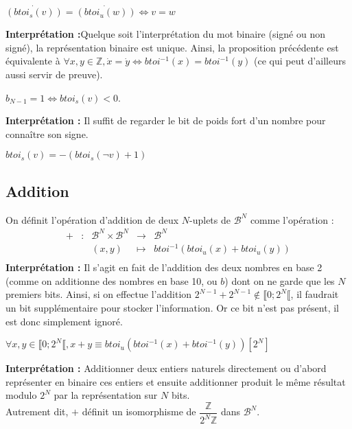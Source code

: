 \documentclass[../../main.tex]{subfiles}
\begin{document}
\proposition{} $\dot{(btoi_{s}(v))} = \dot{(btoi_{u}(w))} \Leftrightarrow v = w$

\textbf{Interprétation :}\newline Quelque soit l'interprétation du mot binaire (signé ou non signé), la représentation binaire est unique. Ainsi, la proposition précédente est équivalente à $\forall{x, y\in{\mathbb{Z}}}, \dot{x} = \dot{y} \Leftrightarrow btoi^{-1}(x) = btoi^{-1}(y)$ (ce qui peut d'ailleurs aussi servir de preuve).

\proposition{} $b_{N-1} = 1 \Leftrightarrow btoi_{s}(v) < 0$.

\textbf{Interprétation :} Il suffit de regarder le bit de poids fort d'un nombre pour connaître son signe.

\proposition{} $btoi_{s}(v) = -(btoi_{s}(\neg{v}) + 1)$

\subsection{Addition} \label{sub:addition}
On définit l'opération d'addition de deux $N$-uplets de $\mathcal{B}^{N}$ comme l'opération :
$$
\begin{array}{lclcl}
+ & : & \mathcal{B}^{N}\times{\mathcal{B}^{N}} & \rightarrow & \mathcal{B}^{N} \\
  &   & (x, y) & \mapsto & btoi^{-1}(btoi_{u}(x) + btoi_{u}(y)) \\
\end{array}
$$
\textbf{Interprétation :} Il s'agit en fait de l'addition des deux nombres en base 2 (comme on additionne des nombres en base 10, ou $b$) dont on ne garde que les $N$ premiers bits. Ainsi, si on effectue l'addition $2^{N-1} + 2^{N-1}\notin{\llbracket 0; 2^{N}\llbracket}$, il faudrait un bit supplémentaire pour stocker l'information. Or ce bit n'est pas présent, il est donc simplement ignoré.

 $\forall{x, y\in{\llbracket 0; 2^{N}\llbracket}}, x + y \equiv btoi_{u}(btoi^{-1}(x) + btoi^{-1}(y)) [2^{N}]$

\textbf{Interprétation :} Additionner deux entiers naturels directement ou d'abord représenter en binaire ces entiers et ensuite additionner produit le même résultat modulo $2^{N}$ par la représentation sur $N$ bits. \\
Autrement dit, $+$ définit un isomorphisme de $\dfrac{\mathbb{Z}}{2^{N}\mathbb{Z}}$ dans $\mathcal{B}^{N}$.
\end{document}
